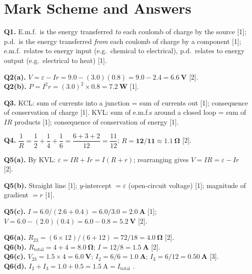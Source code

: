 \section{Mark Scheme and Answers}

\begin{markscheme}

\textbf{Q1.} E.m.f.\ is the energy transferred \emph{to} each coulomb of charge by the source [1]; p.d.\ is the energy transferred \emph{from} each coulomb of charge by a component [1]; e.m.f.\ relates to energy input (e.g.\ chemical to electrical), p.d.\ relates to energy output (e.g.\ electrical to heat) [1].

\vspace{0.5em}\textbf{Q2(a).} $V = \varepsilon - Ir = 9.0 - (3.0)(0.8) = 9.0 - 2.4 = \mathbf{6.6\ \text{V}}$ [2].\\
\textbf{Q2(b).} $P = I^2 r = (3.0)^2 \times 0.8 = \mathbf{7.2\ \text{W}}$ [1].

\vspace{0.5em}\textbf{Q3.} KCL: sum of currents into a junction = sum of currents out [1]; consequence of conservation of charge [1]. KVL: sum of e.m.f.s around a closed loop = sum of $IR$ products [1]; consequence of conservation of energy [1].

\vspace{0.5em}\textbf{Q4.} $\dfrac{1}{R} = \dfrac{1}{2} + \dfrac{1}{4} + \dfrac{1}{6} = \dfrac{6+3+2}{12} = \dfrac{11}{12}$; \quad $R = \mathbf{12/11 \approx 1.1\ \Omega}$ [2].

\vspace{0.5em}\textbf{Q5(a).} By KVL: $\varepsilon = IR + Ir = I(R+r)$; rearranging gives $V = IR = \varepsilon - Ir$ [2].

\vspace{0.5em}\textbf{Q5(b).} Straight line [1]; $y$-intercept $= \varepsilon$ (open-circuit voltage) [1]; magnitude of gradient $= r$ [1].

\vspace{0.5em}\textbf{Q5(c).} $I = 6.0/(2.6+0.4) = 6.0/3.0 = \mathbf{2.0\ \text{A}}$ [1]; $V = 6.0 - (2.0)(0.4) = 6.0 - 0.8 = \mathbf{5.2\ \text{V}}$ [2].

\vspace{0.5em}\textbf{Q6(a).} $R_{23} = (6 \times 12)/(6+12) = 72/18 = \mathbf{4.0\ \Omega}$ [2].\\
\textbf{Q6(b).} $R_{\text{total}} = 4 + 4 = \mathbf{8.0\ \Omega}$; $I = 12/8 = \mathbf{1.5\ \text{A}}$ [2].\\
\textbf{Q6(c).} $V_{23} = 1.5 \times 4 = \mathbf{6.0\ \text{V}}$; $I_2 = 6/6 = \mathbf{1.0\ \text{A}}$; $I_3 = 6/12 = \mathbf{0.50\ \text{A}}$ [3].\\
\textbf{Q6(d).} $I_2 + I_3 = 1.0 + 0.5 = 1.5\ \text{A} = I_{\text{total}}$ \checkmark [1].


\end{markscheme}
